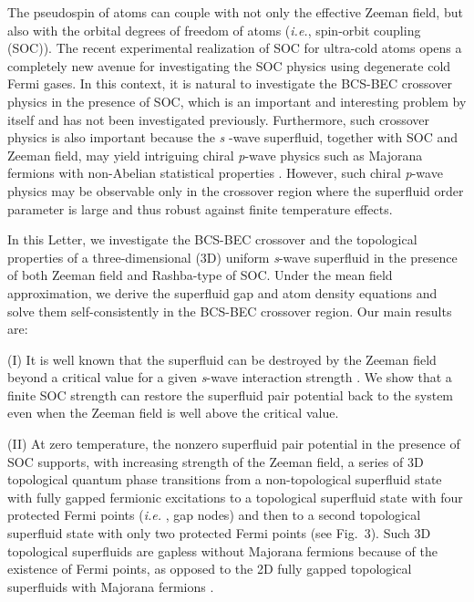 \documentclass[prl,showpacs,twocolumn]{revtex4-1}
\begin{document}
The pseudospin of atoms can couple with not only the effective Zeeman field,
but also with the orbital degrees of freedom of atoms (\textit{i.e.},
spin-orbit coupling (SOC)). The recent experimental realization of SOC for
ultra-cold atoms \cite{Lin} opens a completely new avenue for investigating
the SOC physics using degenerate cold Fermi gases. In this context, it is
natural to investigate the BCS-BEC crossover physics \cite%
{BCStheory1,BCStheory2} in the presence of SOC, which is an important and
interesting problem by itself and has not been investigated previously.
Furthermore, such crossover physics is also important because the \textit{s}%
-wave superfluid, together with SOC and Zeeman field, may yield intriguing
chiral \textit{p}-wave physics \cite{Zhang08} such as Majorana fermions with
non-Abelian statistical properties \cite{Nayak}. However, such chiral
\textit{p}-wave physics may be observable only in the crossover region where
the superfluid order parameter is large and thus robust against finite
temperature effects.

In this Letter, we investigate the BCS-BEC crossover and the topological
properties of a three-dimensional (3D) uniform \textit{s}-wave superfluid in
the presence of both Zeeman field and Rashba-type of SOC. Under the mean
field approximation, we derive the superfluid gap and atom density equations
and solve them self-consistently in the BCS-BEC crossover region. Our main
results are:

(I) It is well known that the superfluid can be destroyed by the Zeeman
field beyond a critical value for a given \textit{s}-wave interaction
strength \cite{Zeeman}. We show that a finite SOC strength can restore the
superfluid pair potential back to the system even when the Zeeman field is
well above the critical value.

(II) At zero temperature, the nonzero superfluid pair potential in the
presence of SOC supports, with increasing strength of the Zeeman field, a
series of 3D topological quantum phase transitions \cite{Volovik} from a
non-topological superfluid state with fully gapped fermionic excitations to
a topological superfluid state with four protected Fermi points (\textit{i.e.%
}, gap nodes) and then to a second topological superfluid state with only
two protected Fermi points (see Fig.~3). Such 3D topological superfluids are
gapless without Majorana fermions because of the existence of Fermi points,
as opposed to the 2D fully gapped topological superfluids with Majorana
fermions \cite{Nayak}.
\end{document}
